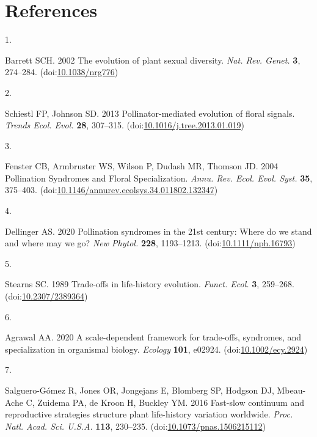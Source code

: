 \documentclass[
  12pt,
  a4paper,
]{article}
\newlength{\cslhangindent}
\newlength{\csllabelwidth}
\newlength{\cslentryspacingunit} %
\newenvironment{CSLReferences}[2] %
 {%
  \setlength{\parindent}{0pt}
  \ifodd #1
  \let\oldpar\par
  \def\par{\hangindent=\cslhangindent\oldpar}
  \fi
  \setlength{\parskip}{#2\cslentryspacingunit}
 }%
 {}
\newcommand{\CSLLeftMargin}[1]{\parbox[t]{\csllabelwidth}{#1}}
\newcommand{\CSLRightInline}[1]{\parbox[t]{\linewidth - \csllabelwidth}{#1}\break}
\begin{document}
\hypertarget{references}{%
\section{References}\label{references}}

\hypertarget{refs}{}
\begin{CSLReferences}{0}{0}
\leavevmode{}%
\CSLLeftMargin{1. }
\CSLRightInline{Barrett SCH. 2002 The evolution of plant sexual diversity. \emph{Nat. Rev. Genet.} \textbf{3}, 274--284. (doi:\href{https://doi.org/10.1038/nrg776}{10.1038/nrg776})}

\leavevmode{}%
\CSLLeftMargin{2. }
\CSLRightInline{Schiestl FP, Johnson SD. 2013 Pollinator-mediated evolution of floral signals. \emph{Trends Ecol. Evol.} \textbf{28}, 307--315. (doi:\href{https://doi.org/10.1016/j.tree.2013.01.019}{10.1016/j.tree.2013.01.019})}

\leavevmode{}%
\CSLLeftMargin{3. }
\CSLRightInline{Fenster CB, Armbruster WS, Wilson P, Dudash MR, Thomson JD. 2004 Pollination {Syndromes} and {Floral Specialization}. \emph{Annu. Rev. Ecol. Evol. Syst.} \textbf{35}, 375--403. (doi:\href{https://doi.org/10.1146/annurev.ecolsys.34.011802.132347}{10.1146/annurev.ecolsys.34.011802.132347})}

\leavevmode{}%
\CSLLeftMargin{4. }
\CSLRightInline{Dellinger AS. 2020 Pollination syndromes in the 21st century: Where do we stand and where may we go? \emph{New Phytol.} \textbf{228}, 1193--1213. (doi:\href{https://doi.org/10.1111/nph.16793}{10.1111/nph.16793})}

\leavevmode{}%
\CSLLeftMargin{5. }
\CSLRightInline{Stearns SC. 1989 Trade-offs in life-history evolution. \emph{Funct. Ecol.} \textbf{3}, 259--268. (doi:\href{https://doi.org/10.2307/2389364}{10.2307/2389364})}

\leavevmode{}%
\CSLLeftMargin{6. }
\CSLRightInline{Agrawal AA. 2020 A scale-dependent framework for trade-offs, syndromes, and specialization in organismal biology. \emph{Ecology} \textbf{101}, e02924. (doi:\href{https://doi.org/10.1002/ecy.2924}{10.1002/ecy.2924})}

\leavevmode{}%
\CSLLeftMargin{7. }
\CSLRightInline{Salguero-Gómez R, Jones OR, Jongejans E, Blomberg SP, Hodgson DJ, Mbeau-Ache C, Zuidema PA, de Kroon H, Buckley YM. 2016 Fast-slow continuum and reproductive strategies structure plant life-history variation worldwide. \emph{Proc. Natl. Acad. Sci. U.S.A.} \textbf{113}, 230--235. (doi:\href{https://doi.org/10.1073/pnas.1506215112}{10.1073/pnas.1506215112})}


\end{CSLReferences}
\end{document}
